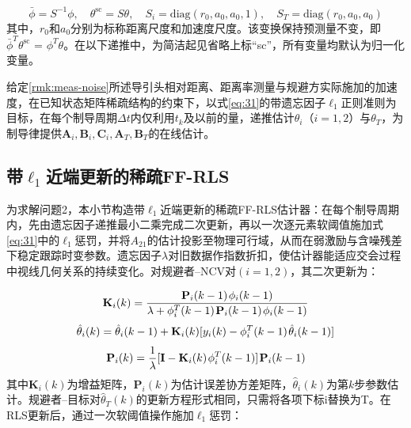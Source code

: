 \begin{equation}
\label{eq:32}
\bar{\phi} = {S^{ - 1}}\phi ,\quad {\theta ^{{\text{sc}}}} = S\theta ,\quad {S_i} = {\text{diag}}({r_0},{a_0},{a_0},1),\quad {S_T} = {\text{diag}}({r_0},{a_0},{a_0})
\end{equation}
其中，${r_0}$和${a_0}$分别为标称距离尺度和加速度尺度。该变换保持预测量不变，即$\bar{\phi}^{T}{\theta ^{{\text{sc}}}}{\text{ = }}{\phi ^T}\theta $。在以下递推中，为简洁起见省略上标“sc”，所有变量均默认为归一化变量。

\begin{problem}[结构稀疏参数辨识]
给定\cref{rmk:meas-noise}所述导引头相对距离、距离率测量与规避方实际施加的加速度，在已知状态矩阵稀疏结构的约束下，以式\eqref{eq:31}的带遗忘因子${\ell _1}$正则准则为目标，在每个制导周期$\Delta t$内仅利用${t_k}$及以前的量，递推估计${\theta _i}$（$i = 1,2$）与${\theta _T}$，为制导律提供${{\mathbf{A}}_i},{{\mathbf{B}}_i},{{\mathbf{C}}_i},{{\mathbf{A}}_T},{{\mathbf{B}}_T}$的在线估计。
\end{problem}
\subsection{带${\ell _1}$近端更新的稀疏FF-RLS}
为求解问题2，本小节构造带${\ell _1}$近端更新的稀疏FF-RLS估计器：在每个制导周期内，先由遗忘因子递推最小二乘完成二次更新，再以一次逐元素软阈值施加式\eqref{eq:31}中的${\ell _1}$惩罚，并将${A_{21}}$的估计投影至物理可行域，从而在弱激励与含噪残差下稳定跟踪时变参数。遗忘因子$\lambda$对旧数据作指数折扣，使估计器能适应交会过程中视线几何关系的持续变化。对规避者–NCV对$(i = 1,2)$，其二次更新为：

\begin{equation}
\label{eq:33}
{{\mathbf{K}}_i}(k) = \frac{{{{\mathbf{P}}_i}(k - 1){\kern 1pt} {\phi _i}(k - 1)}}{{\lambda  + \phi _i^T(k - 1){\kern 1pt} {{\mathbf{P}}_i}(k - 1){\kern 1pt} {\phi _i}(k - 1)}}
\end{equation}
\begin{equation}
\label{eq:34}
\hat{\theta}_{i}(k) = \hat{\theta}_{i}(k - 1) + {{\mathbf{K}}_i}(k)[{y_i}(k) - \phi _i^T(k - 1){\kern 1pt} \hat{\theta}_{i}(k - 1)]
\end{equation}
\begin{equation}
\label{eq:35}
{{\mathbf{P}}_i}(k) = \frac{1}{\lambda }[{\mathbf{I}} - {{\mathbf{K}}_i}(k){\kern 1pt} \phi _i^T(k - 1)]{\kern 1pt} {{\mathbf{P}}_i}(k - 1)
\end{equation}
其中${{\mathbf{K}}_i}(k)$为增益矩阵，${{\mathbf{P}}_i}(k)$为估计误差协方差矩阵，$\hat{\theta}_{i}(k)$为第$k$步参数估计。规避者–目标对$\hat{\theta}_{T}(k)$的更新方程形式相同，只需将各项下标i替换为T。在RLS更新后，通过一次软阈值操作施加${\ell _1}$惩罚：

